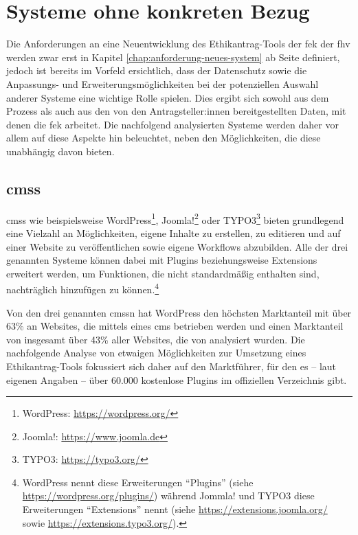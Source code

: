 \documentclass[a4paper,12pt,twoside]{scrreprt}
\begin{document}
\section{Systeme ohne konkreten Bezug}
\label{sec:systeme-ohne-bezug}

Die Anforderungen an eine Neuentwicklung des Ethikantrag-Tools der \ac{fek} der \ac{fhv} werden zwar erst in Kapitel \ref{chap:anforderung-neues-system} ab Seite \pageref{chap:anforderung-neues-system} definiert, jedoch ist bereits im Vorfeld ersichtlich, dass der Datenschutz sowie die Anpassungs- und Erweiterungsmöglichkeiten bei der potenziellen Auswahl anderer Systeme eine wichtige Rolle spielen. Dies ergibt sich sowohl aus dem Prozess als auch aus den von den Antragsteller:innen bereitgestellten Daten, mit denen die \acl{fek} arbeitet. Die nachfolgend analysierten Systeme werden daher vor allem auf diese Aspekte hin beleuchtet, neben den Möglichkeiten, die diese unabhängig davon bieten.

\subsection{\aclp{cms}}
\label{sub-sec:cms-syteme}

\acp{cms} wie beispielsweise WordPress\footnote{WordPress: \url{https://wordpress.org/}}, Joomla!\footnote{Joomla!: \url{https://www.joomla.de}} oder TYPO3\footnote{TYPO3: \url{https://typo3.org/}} bieten grundlegend eine Vielzahl an Möglichkeiten, eigene Inhalte zu erstellen, zu editieren und auf einer Website zu veröffentlichen sowie eigene Workflows abzubilden. \cite{oracle_corporation_who_2022} Alle der drei genannten Systeme können dabei mit Plugins beziehungsweise Extensions erweitert werden, um Funktionen, die nicht standardmäßig enthalten sind, nachträglich hinzufügen zu können.\footnote{WordPress nennt diese Erweiterungen \enquote{Plugins} (siehe \url{https://wordpress.org/plugins/}) während Jommla! und TYPO3 diese Erweiterungen \enquote{Extensions} nennt (siehe \url{https://extensions.joomla.org/} sowie \url{https://extensions.typo3.org/}).}

\medskip

Von den drei genannten \aclp{cms}n hat WordPress den höchsten Marktanteil mit über 63\% an Websites, die mittels eines \ac{cms} betrieben werden und einen Marktanteil von insgesamt über 43\% aller Websites, die von \cite{q-success_di_gelbmann_gmbh_usage_2023} analysiert wurden. Die nachfolgende Analyse von etwaigen Möglichkeiten zur Umsetzung eines Ethikantrag-Tools fokussiert sich daher auf den Marktführer, für den es -- laut eigenen Angaben \cite{wordpress_foundation_wordpress_2023} -- über 60.000 kostenlose Plugins im offiziellen Verzeichnis gibt.
\end{document}
